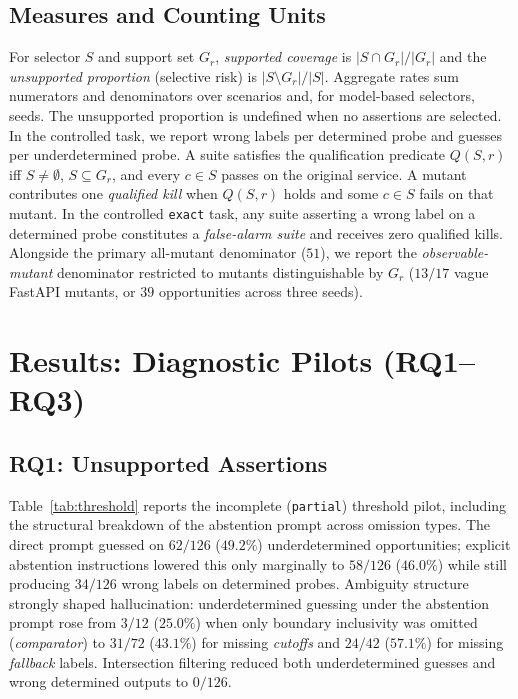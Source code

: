 \documentclass[sigconf,nonacm]{acmart}
\begin{document}
\subsection{Measures and Counting Units}
\label{sec:measures}
For selector $S$ and support set $G_r$, \emph{supported coverage} is $|S\cap G_r|/|G_r|$ and the \emph{unsupported proportion} (selective risk) is $|S\setminus G_r|/|S|$. Aggregate rates sum numerators and denominators over scenarios and, for model-based selectors, seeds. The unsupported proportion is undefined when no assertions are selected. In the controlled task, we report wrong labels per determined probe and guesses per underdetermined probe. A suite satisfies the qualification predicate $Q(S,r)$ iff $S\neq\emptyset$, $S\subseteq G_r$, and every $c\in S$ passes on the original service. A mutant contributes one \emph{qualified kill} when $Q(S,r)$ holds and some $c\in S$ fails on that mutant. In the controlled \texttt{exact} task, any suite asserting a wrong label on a determined probe constitutes a \emph{false-alarm suite} and receives zero qualified kills. Alongside the primary all-mutant denominator ($51$), we report the \emph{observable-mutant} denominator restricted to mutants distinguishable by $G_r$ ($13/17$ vague FastAPI mutants, or $39$ opportunities across three seeds).

\section{Results: Diagnostic Pilots (RQ1--RQ3)}
\subsection{RQ1: Unsupported Assertions}
Table~\ref{tab:threshold} reports the incomplete (\texttt{partial}) threshold pilot, including the structural breakdown of the abstention prompt across omission types. The direct prompt guessed on $62/126$ ($49.2\%$) underdetermined opportunities; explicit abstention instructions lowered this only marginally to $58/126$ ($46.0\%$) while still producing $34/126$ wrong labels on determined probes. Ambiguity structure strongly shaped hallucination: underdetermined guessing under the abstention prompt rose from $3/12$ ($25.0\%$) when only boundary inclusivity was omitted (\emph{comparator}) to $31/72$ ($43.1\%$) for missing \emph{cutoffs} and $24/42$ ($57.1\%$) for missing \emph{fallback} labels. Intersection filtering reduced both underdetermined guesses and wrong determined outputs to $0/126$.
\end{document}
